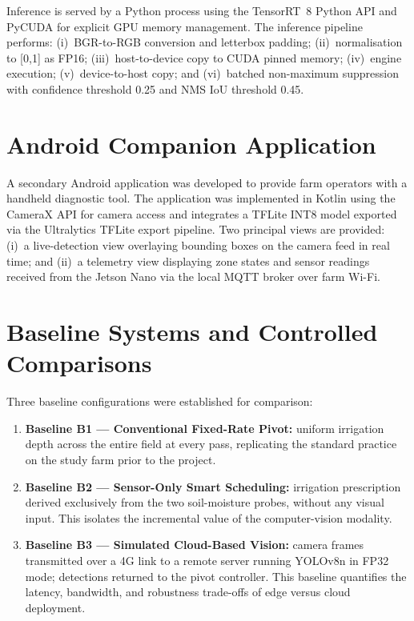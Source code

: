 \documentclass[12pt,a4paper]{report}
\begin{document}
Inference is served by a Python process using the TensorRT~8 Python API and PyCUDA for explicit GPU memory management. The inference pipeline performs: (i)~BGR-to-RGB conversion and letterbox padding; (ii)~normalisation to [0,1] as FP16; (iii)~host-to-device copy to CUDA pinned memory; (iv)~engine execution; (v)~device-to-host copy; and (vi)~batched non-maximum suppression with confidence threshold 0.25 and NMS IoU threshold 0.45.

\section{Android Companion Application}

A secondary Android application was developed to provide farm operators with a handheld diagnostic tool. The application was implemented in Kotlin using the CameraX API for camera access and integrates a TFLite INT8 model exported via the Ultralytics TFLite export pipeline. Two principal views are provided: (i)~a live-detection view overlaying bounding boxes on the camera feed in real time; and (ii)~a telemetry view displaying zone states and sensor readings received from the Jetson Nano via the local MQTT broker over farm Wi-Fi.

\section{Baseline Systems and Controlled Comparisons}

Three baseline configurations were established for comparison:
\begin{enumerate}
    \item \textbf{Baseline B1 --- Conventional Fixed-Rate Pivot:} uniform irrigation depth across the entire field at every pass, replicating the standard practice on the study farm prior to the project.
    \item \textbf{Baseline B2 --- Sensor-Only Smart Scheduling:} irrigation prescription derived exclusively from the two soil-moisture probes, without any visual input. This isolates the incremental value of the computer-vision modality.
    \item \textbf{Baseline B3 --- Simulated Cloud-Based Vision:} camera frames transmitted over a 4G link to a remote server running YOLOv8n in FP32 mode; detections returned to the pivot controller. This baseline quantifies the latency, bandwidth, and robustness trade-offs of edge versus cloud deployment.
\end{enumerate}
\end{document}
